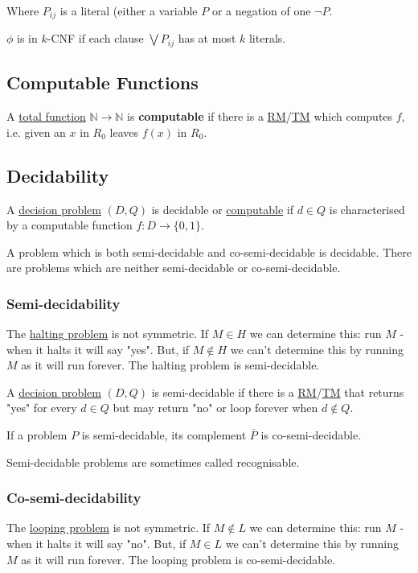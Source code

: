 \documentclass{article}
\begin{document}
Where $P_{ij}$ is a literal (either a variable $P$ or a negation of one $\neg P$.

$\phi$ is in $k$-CNF if each clause $\bigvee P_{ij}$ has at most $k$ literals.


\subsection{Computable Functions}\label{computable}
A \hyperref[total]{total function} $\mathbb{N} \to \mathbb{N}$ is \textbf{computable} if there is a \hyperref[rm]{RM}/\hyperref[tm]{TM} which computes $f$, i.e. given an $x$ in $R_0$ leaves $f(x)$ in $R_0$.


\subsection{Decidability}\label{decidable}
A \hyperref[decision problem]{decision problem} $(D, Q)$ is decidable or \hyperref[computable]{computable} if $d \in Q$ is characterised by a computable function $f : D \to \{0, 1\}$.

A problem which is both semi-decidable and co-semi-decidable is decidable. There are problems which are neither semi-decidable or co-semi-decidable.

\subsubsection{Semi-decidability}\label{semi-decidable}
The \hyperref[halting]{halting problem} is not symmetric. If $M \in H$ we can determine this: run $M$ - when it halts it will say "yes". But, if $M \not \in H$ we can't determine this by running $M$ as it will run forever. The halting problem is semi-decidable.

A \hyperref[decision problem]{decision problem} $(D, Q)$ is semi-decidable if there is a \hyperref[rm]{RM}/\hyperref[tm]{TM} that returns "yes" for every $d \in Q$ but may return "no" or loop forever when $d \not \in Q$.

If a problem $P$ is semi-decidable, its complement $\overline P$ is co-semi-decidable.

Semi-decidable problems are sometimes called recognisable.

\subsubsection{Co-semi-decidability}\label{co-semi-decidable}
The \hyperref[looping]{looping problem} is not symmetric. If $M \not \in L$ we can determine this: run $M$ - when it halts it will say "no". But, if $M \in L$ we can't determine this by running $M$ as it will run forever. The looping problem is co-semi-decidable.
\end{document}
